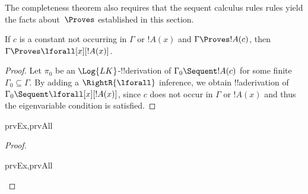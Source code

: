 \documentclass[../../../include/open-logic-section]{subfiles}
\begin{document}

\begin{explain}
  The completeness theorem also requires that the sequent calculus
  rules rules yield the facts about~$\Proves$ established in this
  section.
\end{explain}

\begin{thm}
 If $c$ is a constant not occurring
in $\Gamma$ or $!A(x)$ and $\Gamma \Proves !A(c)$, then $\Gamma
\Proves \lforall[x][!A(x)]$.
\end{thm}

\begin{proof}
Let $\pi_0$ be an $\Log{LK}$-!!{derivation} of $\Gamma_0 \Sequent !A(c)$
for some finite $\Gamma_0 \subseteq \Gamma$.  By adding a
$\RightR{\lforall}$ inference, we obtain !!a{derivation} of $\Gamma_0 \Sequent
\lforall[x][!A(x)]$, since $c$ does not occur in $\Gamma$ or $!A(x)$
and thus the eigenvariable condition is satisfied.
\end{proof}

\begin{prop}
\begin{tagenumerate}{prvEx,prvAll}
\end{tagenumerate}
\end{prop}

\begin{proof}
\begin{tagenumerate}{prvEx,prvAll}
\end{tagenumerate}
\end{proof}
\end{document}
